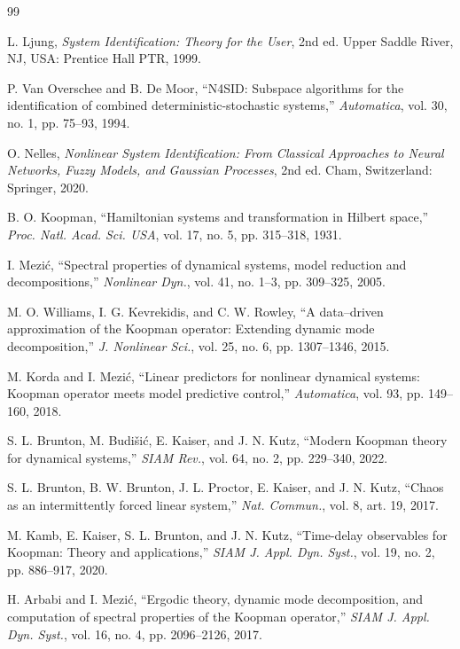 \documentclass[journal]{IEEEtran}
\begin{document}
\begin{thebibliography}{99}

L. Ljung, \emph{System Identification: Theory for the User}, 2nd ed. Upper Saddle River, NJ, USA: Prentice Hall PTR, 1999.

P. Van Overschee and B. De Moor, ``N4SID: Subspace algorithms for the identification of combined deterministic-stochastic systems,'' \emph{Automatica}, vol. 30, no. 1, pp. 75--93, 1994.

O. Nelles, \emph{Nonlinear System Identification: From Classical Approaches to Neural Networks, Fuzzy Models, and Gaussian Processes}, 2nd ed. Cham, Switzerland: Springer, 2020.

B. O. Koopman, ``Hamiltonian systems and transformation in Hilbert space,'' \emph{Proc. Natl. Acad. Sci. USA}, vol. 17, no. 5, pp. 315--318, 1931.

I. Mezi\'c, ``Spectral properties of dynamical systems, model reduction and decompositions,'' \emph{Nonlinear Dyn.}, vol. 41, no. 1--3, pp. 309--325, 2005.

M. O. Williams, I. G. Kevrekidis, and C. W. Rowley, ``A data--driven approximation of the Koopman operator: Extending dynamic mode decomposition,'' \emph{J. Nonlinear Sci.}, vol. 25, no. 6, pp. 1307--1346, 2015.

M. Korda and I. Mezi\'c, ``Linear predictors for nonlinear dynamical systems: Koopman operator meets model predictive control,'' \emph{Automatica}, vol. 93, pp. 149--160, 2018.

S. L. Brunton, M. Budi\v{s}i\'c, E. Kaiser, and J. N. Kutz, ``Modern Koopman theory for dynamical systems,'' \emph{SIAM Rev.}, vol. 64, no. 2, pp. 229--340, 2022.

S. L. Brunton, B. W. Brunton, J. L. Proctor, E. Kaiser, and J. N. Kutz, ``Chaos as an intermittently forced linear system,'' \emph{Nat. Commun.}, vol. 8, art. 19, 2017.

M. Kamb, E. Kaiser, S. L. Brunton, and J. N. Kutz, ``Time-delay observables for Koopman: Theory and applications,'' \emph{SIAM J. Appl. Dyn. Syst.}, vol. 19, no. 2, pp. 886--917, 2020.

H. Arbabi and I. Mezi\'c, ``Ergodic theory, dynamic mode decomposition, and computation of spectral properties of the Koopman operator,'' \emph{SIAM J. Appl. Dyn. Syst.}, vol. 16, no. 4, pp. 2096--2126, 2017.


\end{thebibliography}
\end{document}
